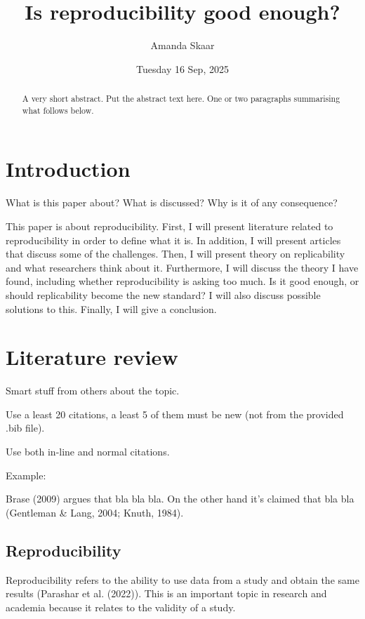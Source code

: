 \documentclass[
  a4paper,
]{article}
\title{Is reproducibility good enough?}
\author{Amanda Skaar}
\date{Tuesday 16 Sep, 2025}
\begin{document}
\maketitle
\begin{abstract}
A very short abstract. Put the abstract text here. One or two paragraphs
summarising what follows below.
\end{abstract}


\section{Introduction}\label{introduction}

What is this paper about? What is discussed? Why is it of any
consequence?

This paper is about reproducibility. First, I will present literature
related to reproducibility in order to define what it is. In addition, I
will present articles that discuss some of the challenges. Then, I will
present theory on replicability and what researchers think about it.
Furthermore, I will discuss the theory I have found, including whether
reproducibility is asking too much. Is it good enough, or should
replicability become the new standard? I will also discuss possible
solutions to this. Finally, I will give a conclusion.

\section{Literature review}\label{literature-review}

Smart stuff from others about the topic.

Use a least 20 citations, a least 5 of them must be new (not from the
provided .bib file).

Use both in-line and normal citations.

Example:

Brase (2009) argues that bla bla bla. On the other hand it's claimed
that bla bla (Gentleman \& Lang, 2004; Knuth, 1984).

\subsection{Reproducibility}\label{reproducibility}

Reproducibility refers to the ability to use data from a study and
obtain the same results (Parashar et al. (2022)). This is an important
topic in research and academia because it relates to the validity of a
study.
\end{document}
